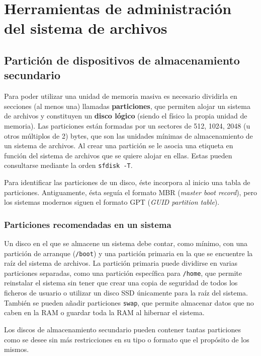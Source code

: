 \section{Herramientas de administración del sistema de archivos}

\subsection{Partición de dispositivos de almacenamiento secundario}

Para poder utilizar una unidad de memoria masiva es necesario dividirla en secciones (al menos una) llamadas \textbf{particiones}, que permiten alojar un sistema de archivos y constituyen un \textbf{disco lógico} (siendo el físico la propia unidad de memoria).
Las particiones están formadas por un sectores de 512, 1024, 2048 (u otros múltiplos de 2) bytes, que son las unidades mínimas de almacenamiento de un sistema de archivos.
Al crear una partición se le asocia una etiqueta en función del sistema de archivos que se quiere alojar en ellas.
Estas pueden consultarse mediante la orden \texttt{sfdisk -T}.

Para identificar las particiones de un disco, éste incorpora al inicio una tabla de particiones.
Antiguamente, ésta seguía el formato MBR (\emph{master boot record}), pero los sistemas modernos siguen el formato GPT (\emph{GUID partition table}).

\subsubsection{Particiones recomendadas en un sistema}

Un disco en el que se almacene un sistema debe contar, como mínimo, con una partición de arranque (\texttt{/boot}) y una partición primaria en la que se encuentre la raíz del sistema de archivos.
La partición primaria puede dividirse en varias particiones separadas, como una partición específica para \texttt{/home}, que permite reinstalar el sistema sin tener que crear una copia de seguridad de todos los ficheros de usuario o utilizar un disco SSD únicamente para la raíz del sistema.
También se pueden añadir particiones \texttt{swap}, que permite almacenar datos que no caben en la RAM o guardar toda la RAM al hibernar el sistema.

Los discos de almacenamiento secundario pueden contener tantas particiones como se desee sin más restricciones en su tipo o formato que el propósito de los mismos.

